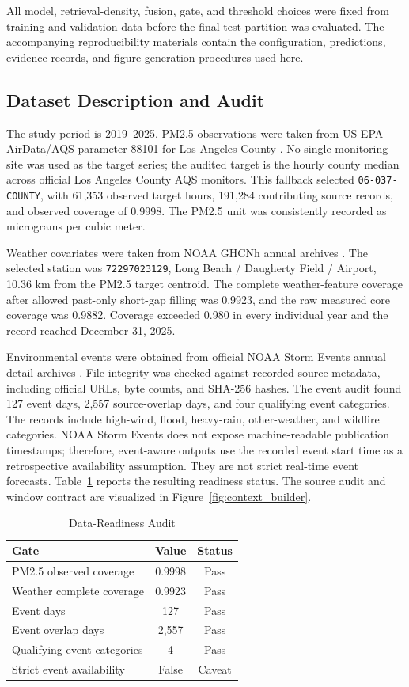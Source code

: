 \documentclass{ieeeaccess}
\begin{document}
All model, retrieval-density, fusion, gate, and threshold choices were fixed
from training and validation data before the final test partition was evaluated.
The accompanying reproducibility materials contain the configuration,
predictions, evidence records, and figure-generation procedures used here.

\subsection{Dataset Description and Audit}
The study period is 2019--2025. PM2.5 observations were taken from US EPA
AirData/AQS parameter 88101 for Los Angeles County \cite{epaairdata2026}. No
single monitoring site was used as the target series; the audited target is the
hourly county median across official Los Angeles County AQS monitors. This
fallback selected \texttt{06-037-COUNTY}, with 61,353 observed target hours,
191,284 contributing source records, and observed coverage of 0.9998. The
PM2.5 unit was consistently recorded as
micrograms per cubic meter.

Weather covariates were taken from NOAA GHCNh annual archives
\cite{noaaisd2026}. The selected
station was \texttt{72297023129}, Long Beach / Daugherty Field / Airport,
10.36 km from the PM2.5 target centroid. The complete weather-feature coverage
after allowed past-only short-gap filling was 0.9923, and the raw measured core
coverage was 0.9882. Coverage exceeded 0.980 in every individual year and the
record reached December 31, 2025.

Environmental events were obtained from official NOAA Storm Events annual
detail archives \cite{noaastormevents2026}. File integrity was checked against
recorded source metadata, including official URLs, byte counts, and SHA-256
hashes. The event audit found 127 event
days, 2,557 source-overlap days, and four qualifying event categories. The
records include high-wind, flood, heavy-rain, other-weather, and wildfire
categories. NOAA
Storm Events does not expose machine-readable publication timestamps; therefore,
event-aware outputs use the recorded event start time as a retrospective
availability assumption. They are not strict real-time event forecasts.
Table~\ref{tab:data_audit} reports the resulting readiness status. The source
audit and window contract are visualized in Figure~\ref{fig:context_builder}.

\begin{table}[!t]
\centering
\caption{Data-Readiness Audit}
\label{tab:data_audit}
\begin{tabular}{lcc}
\toprule
Gate & Value & Status \\
\midrule
PM2.5 observed coverage & 0.9998 & Pass \\
Weather complete coverage & 0.9923 & Pass \\
Event days & 127 & Pass \\
Event overlap days & 2,557 & Pass \\
Qualifying event categories & 4 & Pass \\
Strict event availability & False & Caveat \\
\bottomrule
\end{tabular}
\end{table}
\end{document}
